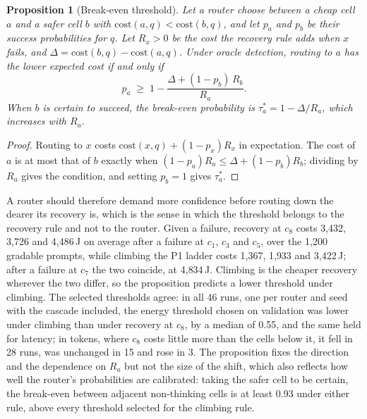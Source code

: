 \documentclass[final,5p,times,twocolumn]{elsarticle}
\theoremstyle{plain}
\newtheorem{proposition}{Proposition}
\newcommand{\cost}{\mathrm{cost}}
\begin{document}
\begin{proposition}[Break-even threshold]
\label{prop:tau}
Let a router choose between a cheap cell $a$ and a safer cell $b$ with
$\cost(a, q) < \cost(b, q)$, and let $p_a$ and $p_b$ be their success
probabilities for $q$. Let $R_x > 0$ be the cost the recovery rule adds when
$x$ fails, and $\Delta = \cost(b, q) - \cost(a, q)$. Under oracle detection,
routing to $a$ has the lower expected cost if and only if
\[
  p_a \;\geq\; 1 - \frac{\Delta + (1 - p_b)\,R_b}{R_a}.
\]
When $b$ is certain to succeed, the break-even probability is
$\tau^{*}_a = 1 - \Delta / R_a$, which increases with $R_a$.
\end{proposition}
\begin{proof}
Routing to $x$ costs $\cost(x, q) + (1 - p_x) R_x$ in expectation. The cost of
$a$ is at most that of $b$ exactly when
$(1 - p_a) R_a \leq \Delta + (1 - p_b) R_b$; dividing by $R_a$ gives the
condition, and setting $p_b = 1$ gives $\tau^{*}_a$.
\end{proof}
A router should therefore demand more confidence before routing down the
dearer its recovery is, which is the sense in which the threshold belongs to
the recovery rule and not to the router. Given a failure, recovery at $c_8$
costs 3{,}432, 3{,}726 and 4{,}486\,J on average after a failure at $c_1$,
$c_3$ and $c_5$, over the 1{,}200 gradable prompts, while climbing the P1
ladder costs 1{,}367, 1{,}933 and 3{,}422\,J; after a failure at $c_7$ the two
coincide, at 4{,}834\,J. Climbing is the cheaper recovery wherever the two
differ, so the proposition predicts a lower threshold under climbing. The
selected thresholds agree: in all 46 runs, one per router and seed with the
cascade included, the energy threshold chosen on validation was lower under
climbing than under recovery at $c_8$, by a median of 0.55, and the same held
for latency; in tokens, where $c_8$ costs little more than the cells below it,
it fell in 28 runs, was unchanged in 15 and rose in 3. The proposition fixes
the direction and the dependence on $R_a$ but not the size of the shift, which
also reflects how well the router's probabilities are calibrated: taking the
safer cell to be certain, the break-even between adjacent non-thinking cells
is at least 0.93 under either rule, above every threshold selected for the
climbing rule.
\end{document}
